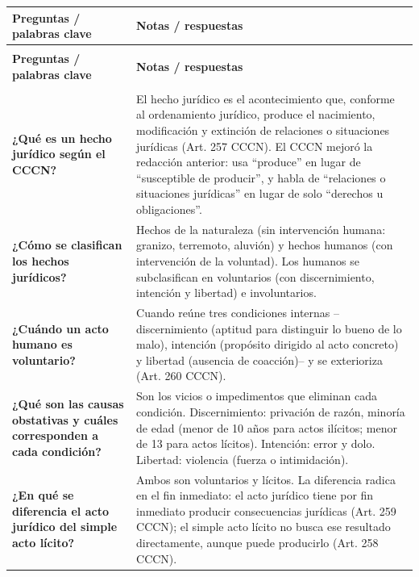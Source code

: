 \documentclass[12pt,oneside]{book}
\begin{document}
\begin{longtable}{
    >{\raggedright\arraybackslash}p{}
    >{\raggedright\arraybackslash}p{}
}
\toprule
\textbf{Preguntas / palabras clave} &
\textbf{Notas / respuestas} \\
\midrule
\endfirsthead
\multicolumn{2}{l}{\textit{Cuadro Cornell de Repaso General (continuación)}} \\
\toprule
\textbf{Preguntas / palabras clave} &
\textbf{Notas / respuestas} \\
\midrule
\endhead
\midrule
\multicolumn{2}{r}{\textit{Continúa en la página siguiente}} \\
\endfoot
\bottomrule
\endlastfoot

\textbf{¿Qué es un hecho jurídico según el CCCN?} &
El hecho jurídico es el acontecimiento que, conforme al ordenamiento jurídico, produce el nacimiento, modificación y extinción de relaciones o situaciones jurídicas (Art. 257 CCCN). El CCCN mejoró la redacción anterior: usa ``produce'' en lugar de ``susceptible de producir'', y habla de ``relaciones o situaciones jurídicas'' en lugar de solo ``derechos u obligaciones''. \\

\textbf{¿Cómo se clasifican los hechos jurídicos?} &
Hechos de la naturaleza (sin intervención humana: granizo, terremoto, aluvión) y hechos humanos (con intervención de la voluntad). Los humanos se subclasifican en voluntarios (con discernimiento, intención y libertad) e involuntarios. \\

\textbf{¿Cuándo un acto humano es voluntario?} &
Cuando reúne tres condiciones internas --discernimiento (aptitud para distinguir lo bueno de lo malo), intención (propósito dirigido al acto concreto) y libertad (ausencia de coacción)-- y se exterioriza (Art. 260 CCCN). \\

\textbf{¿Qué son las causas obstativas y cuáles corresponden a cada condición?} &
Son los vicios o impedimentos que eliminan cada condición. Discernimiento: privación de razón, minoría de edad (menor de 10 años para actos ilícitos; menor de 13 para actos lícitos). Intención: error y dolo. Libertad: violencia (fuerza o intimidación). \\

\textbf{¿En qué se diferencia el acto jurídico del simple acto lícito?} &
Ambos son voluntarios y lícitos. La diferencia radica en el fin inmediato: el acto jurídico tiene por fin inmediato producir consecuencias jurídicas (Art. 259 CCCN); el simple acto lícito no busca ese resultado directamente, aunque puede producirlo (Art. 258 CCCN). \\


\end{longtable}
\end{document}
